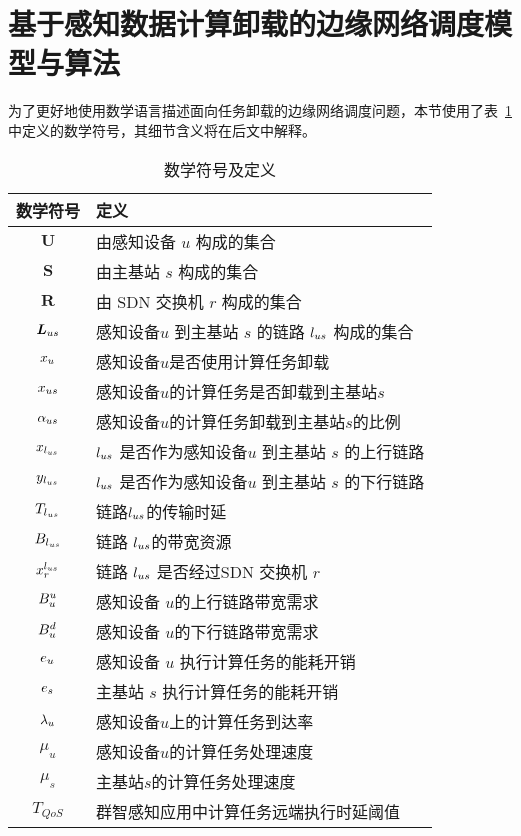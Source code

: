 

\section{基于感知数据计算卸载的边缘网络调度模型与算法}

为了更好地使用数学语言描述面向任务卸载的边缘网络调度问题，本节使用了表~\ref{table_notations_ispa} 中定义的数学符号，其细节含义将在后文中解释。

\begin{table}[!h]
  \caption{数学符号及定义}
  \vspace{-1em}
  \label{table_notations_ispa}
  \centering
  \begin{tabular}{|c|p{8cm}|}
    \hline
    \textbf{数学符号} & \textbf{定义}\\
    \hline
    $\boldsymbol{U}$ & 由感知设备 $u$ 构成的集合\\\hline
    $\boldsymbol{S}$ & 由主基站 $s$ 构成的集合\\\hline
    $\boldsymbol{R}$ & 由 SDN 交换机 $r$ 构成的集合\\\hline
    $\boldsymbol{L}_{us}$ & 感知设备$u$ 到主基站 $s$ 的链路 $l_{us}$ 构成的集合\\\hline
    ${x}_{u}$ & 感知设备$u$是否使用计算任务卸载\\\hline
    ${x}_{us}$ & 感知设备$u$的计算任务是否卸载到主基站$s$\\\hline
    ${\alpha}_{us}$ & 感知设备$u$的计算任务卸载到主基站$s$的比例\\\hline
    $x_{l_{us}}$ & $l_{us}$ 是否作为感知设备$u$ 到主基站 $s$ 的上行链路\\\hline
    $y_{l_{us}}$ & $l_{us}$ 是否作为感知设备$u$ 到主基站 $s$ 的下行链路\\\hline
    $T_{l_{us}}$ & 链路$l_{us}$的传输时延\\\hline
    $B_{l_{us}}$ & 链路 $l_{us}$的带宽资源\\\hline
    $x^{l_{us}}_{r}$ & 链路 $l_{us}$ 是否经过SDN 交换机 $r$\\\hline
    $B^{u}_u$ & 感知设备 $u$的上行链路带宽需求\\\hline
    $B^{d}_u$ & 感知设备 $u$的下行链路带宽需求\\\hline
    $e_u$ & 感知设备 $u$ 执行计算任务的能耗开销\\\hline
    $e_s$ & 主基站 $s$ 执行计算任务的能耗开销\\\hline
    ${\lambda}_{u}$ & 感知设备$u$上的计算任务到达率\\\hline
    $\mu_u$ & 感知设备$u$的计算任务处理速度\\\hline
    $\mu_s$ & 主基站$s$的计算任务处理速度\\\hline
    $T_{QoS}$ & 群智感知应用中计算任务远端执行时延阈值 \\\hline
  \end{tabular}
\end{table}

